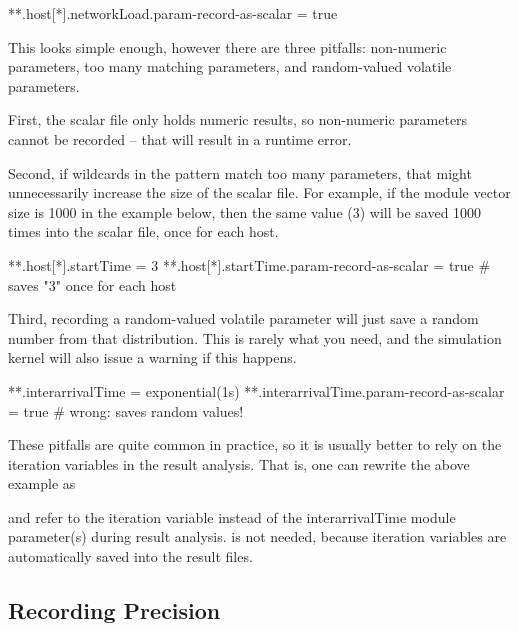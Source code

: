 \begin{inifile}
**.host[*].networkLoad.param-record-as-scalar = true
\end{inifile}

This looks simple enough, however there are three pitfalls:
non-numeric parameters, too many matching parameters, and
random-valued volatile parameters.

First, the scalar file only holds numeric results, so non-numeric
parameters cannot be recorded -- that will result in a runtime
error.

Second, if wildcards in the pattern match too many parameters, that
might unnecessarily increase the size of the scalar file. For example,
if the  module vector size is 1000 in the example below, then the
same value (3) will be saved 1000 times into the scalar file, once for
each host.

\begin{inifile}
**.host[*].startTime = 3
**.host[*].startTime.param-record-as-scalar = true  # saves "3" once for each host
\end{inifile}

Third, recording a random-valued volatile parameter will just save a
random number from that distribution. This is rarely what you need, and
the simulation kernel will also issue a warning if this happens.

\begin{inifile}
**.interarrivalTime = exponential(1s)
**.interarrivalTime.param-record-as-scalar = true  # wrong: saves random values!
\end{inifile}

These pitfalls are quite common in practice, so it is usually better
to rely on the iteration variables in the result analysis.
That is, one can rewrite the above example as


and refer to the  iteration variable instead of the
interarrivalTime module parameter(s) during result analysis.
 is not needed, because iteration variables are
automatically saved into the result files.


\subsection{Recording Precision}
\label{sec:ana-sim:outputfile-precision}

